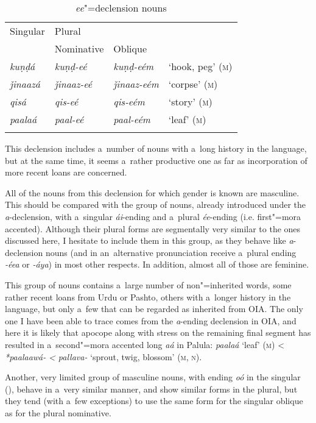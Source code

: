 \begin{table}[ht]
 \label{bkm:Ref193698864}
 \caption{\textit{ee}"=declension nouns}
\begin{tabularx}{\textwidth}{ Q Q Q Q }
\lsptoprule
Singular
&
Plural\\
&
Nominative &
Oblique &
\\\hline
\textit{kuṇḍá} &
\textit{kuṇḍ-eé} &
\textit{kuṇḍ-eém} &
`hook, peg' (\textsc{m})\\
\textit{ǰinaazá} &
\textit{ǰinaaz-eé} &
\textit{ǰinaaz-eém} &
`corpse' (\textsc{m})\\
\textit{qisá} &
\textit{qis-eé} &
\textit{qis-eém} &
`story' (\textsc{m})\\
\textit{paalaá} &
\textit{paal-eé} &
\textit{paal-eém} &
`leaf' (\textsc{m})\\\lspbottomrule
\end{tabularx}
\label{tab:4-18}
\end{table}

This declension includes a~number of nouns with a~long history in the language, but at the same time, it seems a~rather productive one as far as incorporation of more recent loans are concerned.


All of the nouns from this declension for which gender is known are masculine. This should be compared with the group of nouns, already introduced under the \textit{a}-declension, with a~singular \textit{ái}-ending and a~plural \textit{ée}-ending (i.e. first"=mora accented). Although their plural forms are segmentally very similar to the ones discussed here, I hesitate to include them in this group, as they behave like \textit{a}-declension nouns (and in an~alternative pronunciation receive a~plural ending \textit{-éea} or \textit{-áya}) in most other respects. In addition, almost all of those are feminine.


This group of nouns contains a~large number of non"=inherited words, some rather recent loans from Urdu or Pashto, others with a~longer history in the language, but only a~few that can be regarded as inherited from OIA. The only one I have been able to trace comes from the \textit{a}-ending declension in OIA, and here it is likely that apocope along with stress on the remaining final segment has resulted in a~second"=mora accented long \textit{aá} in Palula: \textit{paalaá} `leaf' (\textsc{m}) {\textless} \textit{*paalaawá-} \textit{{\textless} pallava-} `sprout, twig, blossom' (\textsc{m}, \textsc{n}).


Another, very limited group of masculine nouns, with ending \textit{oó} in the singular (), behave in a~very similar manner, and show similar forms in the plural, but they tend (with a~few exceptions) to use the same form for the singular oblique as for the plural nominative. 



